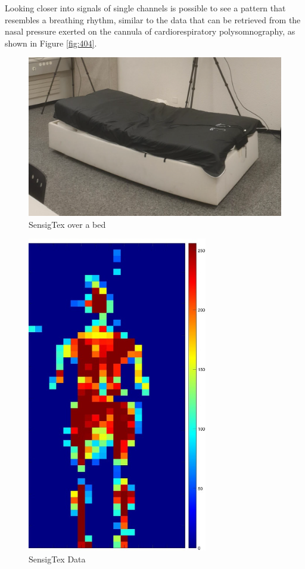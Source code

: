 Looking closer into signals of single channels is possible to see a pattern that resembles a breathing rhythm,  similar to the data that can
 be retrieved from the nasal pressure exerted on the cannula of cardiorespiratory polysomnography, as shown in Figure \ref{fig:404}.



\vspace*{0.5cm}
\begin{figure}[H]
    \centering
    \includegraphics[width=\textwidth]{img/sensingTex.png}
    \caption{SensigTex over a bed}
    \label{fig:sensingtex}
\end{figure}

\begin{figure}[p]
    \centering
    \includegraphics[width=0.7\textwidth]{img/sensingtex_2.jpg}
    \caption{SensigTex Data }
    \label{fig:sensingtexData}
\end{figure}

